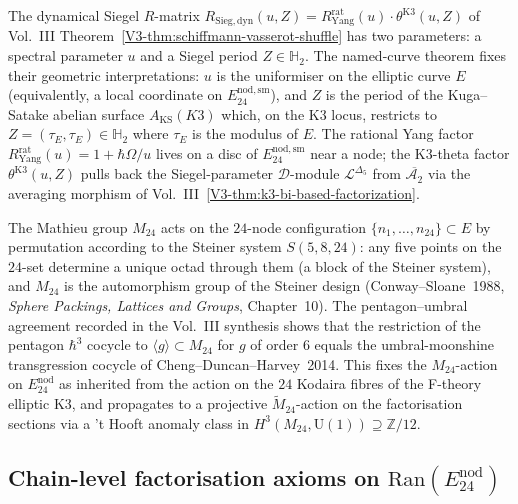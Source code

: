 \begin{remark}[Compatibility with the Drinfeld factorisation $R = R^{\mathrm{rat}}_{\mathrm{Yang}}\cdot\theta^{\mathrm{K3}}$]
\label{rem:confspaces-drinfeld-factorization-compat}
The dynamical Siegel $R$-matrix
$R_{\mathrm{Sieg,dyn}}(u,Z) = R^{\mathrm{rat}}_{\mathrm{Yang}}(u)\cdot
\theta^{\mathrm{K3}}(u,Z)$ of Vol.~III Theorem~\ref{V3-thm:schiffmann-vasserot-shuffle}
has two parameters: a spectral parameter $u$ and a Siegel period
$Z\in\mathbb{H}_2$. The named-curve theorem fixes their geometric
interpretations: $u$ is the uniformiser on the elliptic curve $E$
(equivalently, a local coordinate on $E^{\mathrm{nod,sm}}_{24}$), and $Z$
is the period of the Kuga--Satake abelian surface $A_{\mathrm{KS}}(K3)$
which, on the K3 locus, restricts to $Z = (\tau_E,\tau_E) \in
\mathbb{H}_2$ where $\tau_E$ is the modulus of $E$. The rational
Yang factor $R^{\mathrm{rat}}_{\mathrm{Yang}}(u) = 1 + \hbar\Omega/u$
lives on a disc of $E^{\mathrm{nod,sm}}_{24}$ near a node; the K3-theta
factor $\theta^{\mathrm{K3}}(u,Z)$ pulls back the Siegel-parameter
$\mathcal{D}$-module $\mathcal{L}^{\Delta_5}$ from $\overline{\mathcal{A}_2}$
via the averaging morphism of
Vol.~III~\ref{V3-thm:k3-bi-based-factorization}.
\end{remark}

\begin{remark}
\label{rem:confspaces-m24-steiner-action-named-curve}
The Mathieu group $M_{24}$ acts on the $24$-node configuration
$\{n_1,\ldots,n_{24}\}\subset E$ by permutation according to the
Steiner system $S(5,8,24)$: any five points on the $24$-set determine
a unique octad through them (a block of the Steiner system), and
$M_{24}$ is the automorphism group of the Steiner design
(Conway--Sloane~1988, \emph{Sphere Packings, Lattices and Groups},
Chapter~10). The pentagon--umbral agreement recorded in the Vol.~III synthesis
shows that the restriction of the pentagon $\hbar^3$ cocycle to
$\langle g\rangle \subset M_{24}$ for $g$ of order $6$ equals the
umbral-moonshine transgression cocycle of Cheng--Duncan--Harvey~2014. This fixes the
$M_{24}$-action on $E^{\mathrm{nod}}_{24}$ as inherited from the action
on the $24$ Kodaira fibres of the F-theory elliptic K3, and propagates
to a projective $\widetilde{M}_{24}$-action on the factorisation
sections via a 't Hooft anomaly class in
$H^3(M_{24},\mathrm{U}(1))\supseteq\mathbb{Z}/12$.
\end{remark}

\subsection{Chain-level factorisation axioms on
$\mathrm{Ran}(E^{\mathrm{nod}}_{24})$}
\label{subsec:confspaces-factorisation-axiom-verification}

